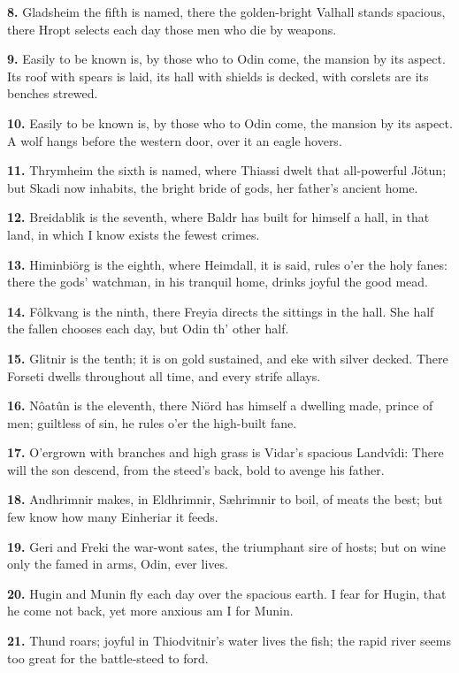\textbf{8.} Gladsheim the fifth is named, there the golden-bright Valhall
stands spacious, there Hropt selects each day those men who die by
weapons.

\textbf{9.} Easily to be known is, by those who to Odin come, the mansion by
its aspect. Its roof with spears is laid, its hall with shields is
decked, with corslets are its benches strewed.

\textbf{10.} Easily to be known is, by those who to Odin come, the mansion by
its aspect. A wolf hangs before the western door, over it an eagle
hovers.

\textbf{11.} Thrymheim the sixth is named, where Thiassi dwelt that
all-powerful Jötun; but Skadi now inhabits, the bright bride of gods,
her father's ancient home.

\textbf{12.} Breidablik is the seventh, where Baldr has built for himself a
hall, in that land, in which I know exists the fewest crimes.

\textbf{13.} Himinbiörg is the eighth, where Heimdall, it is said, rules
o'er the holy fanes: there the gods' watchman, in his tranquil home,
drinks joyful the good mead.

\textbf{14.} Fôlkvang is the ninth, there Freyia directs the sittings in the
hall. She half the fallen chooses each day, but Odin th' other half.

\textbf{15.} Glitnir is the tenth; it is on gold sustained, and eke with
silver decked. There Forseti dwells throughout all time, and every
strife allays.

\textbf{16.} Nôatûn is the eleventh, there Niörd has himself a dwelling made,
prince of men; guiltless of sin, he rules o'er the high-built fane.

\textbf{17.} O'ergrown with branches and high grass is Vidar's spacious
Landvîdi: There will the son descend, from the steed's back, bold to
avenge his father.

\textbf{18.} Andhrimnir makes, in Eldhrimnir, Sæhrimnir to boil, of meats the
best; but few know how many Einheriar it feeds.

\textbf{19.} Geri and Freki the war-wont sates, the triumphant sire of hosts;
but on wine only the famed in arms, Odin, ever lives.

\textbf{20.} Hugin and Munin fly each day over the spacious earth. I fear for
Hugin, that he come not back, yet more anxious am I for Munin.

\textbf{21.} Thund roars; joyful in Thiodvitnir's water lives the fish; the
rapid river seems too great for the battle-steed to ford.

